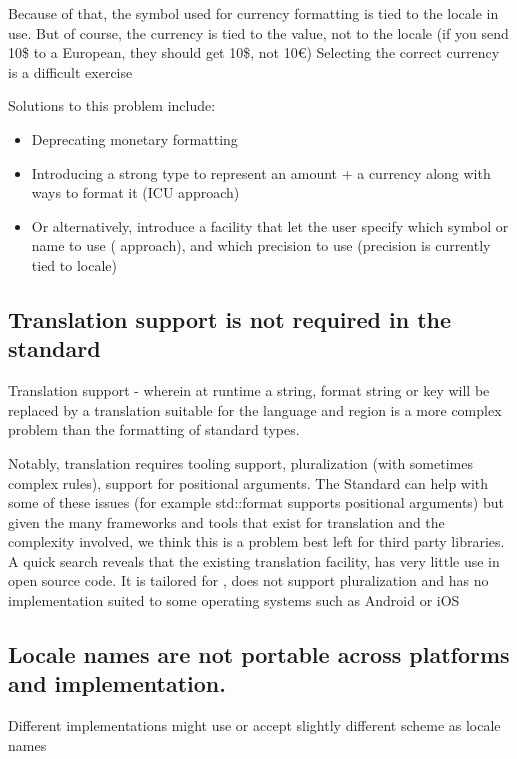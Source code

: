 \documentclass{wg21}
\begin{document}
Because of that, the symbol used for currency formatting is tied to the locale in use.
But of course, the currency is tied to the value, not to the locale (if you send 10\$ to a European, they should get 10\$, not 10€)
Selecting the correct currency is a difficult exercise \cite{Stackoverflow}

Solutions to this problem include:

\begin{itemize}
    \item  Deprecating monetary formatting 
    \item Introducing a strong type to represent an amount + a currency along with ways to format it (ICU approach)
    \item Or alternatively, introduce a facility that let the user specify which symbol or name to use (\cite{QLocale} approach), and which precision to use (precision is currently tied to locale)
\end{itemize}

\subsection{Translation support is not required in the standard}

Translation support - wherein at runtime a string, format string or key will be replaced by a translation suitable for the language and region is a more complex problem than the formatting of standard types.

Notably, translation requires tooling support, pluralization (with sometimes complex rules), support for positional arguments.
The Standard can help with some of these issues (for example std::format supports positional arguments) but given the many frameworks and tools that exist for translation and the complexity involved, we think this is a problem best left for third party libraries.
A quick search reveals that the existing translation facility,  has very little use in open source code.
It is tailored for , does not support pluralization and has no implementation suited to some operating systems such as Android or iOS


\subsection{Locale names are not portable across platforms and implementation.}

Different implementations might use or accept slightly different scheme as locale names
\end{document}
